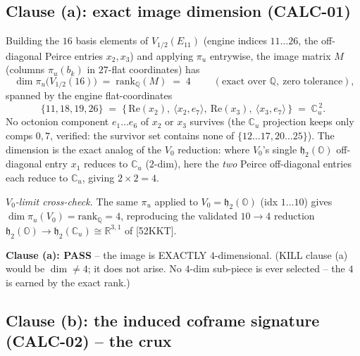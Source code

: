 \subsection{Clause (a): exact image dimension (CALC-01)}

Building the $16$ basis elements of $V_{1/2}(E_{11})$ (engine indices $11\ldots 26$,
the off-diagonal Peirce entries $x_2,x_3$) and applying $\pi_u$ entrywise, the image
matrix $M$ (columns $\pi_u(b_k)$ in $27$-flat coordinates) has
\begin{equation}
  \boxed{\;\dim \pi_u\!\big(V_{1/2}(16)\big) \;=\; \mathrm{rank}_{\mathbb{Q}}(M) \;=\; 4\;}
  \qquad (\text{exact over }\mathbb{Q},\ \text{zero tolerance}),
\end{equation}
spanned by the engine flat-coordinates
\[
  \{11,18,19,26\} \;=\; \{\,\mathrm{Re}(x_2),\ \langle x_2,e_7\rangle,\ \mathrm{Re}(x_3),\ \langle x_3,e_7\rangle\,\}
  \;=\; \mathbb{C}_u^{\,2}.
\]
No octonion component $e_1\ldots e_6$ of $x_2$ or $x_3$ survives (the $\mathbb{C}_u$
projection keeps only comps $0,7$, verified: the survivor set contains none of
$\{12\ldots17,20\ldots25\}$). The dimension is the exact analog of the $V_0$
reduction: where $V_0$'s single $\mathfrak{h}_2(\mathbb{O})$ off-diagonal entry $x_1$
reduces to $\mathbb{C}_u$ ($2$-dim), here the \emph{two} Peirce off-diagonal entries
each reduce to $\mathbb{C}_u$, giving $2\times 2 = 4$.

\emph{$V_0$-limit cross-check.} The same $\pi_u$ applied to $V_0=\mathfrak{h}_2(\mathbb{O})$
(idx $1\ldots10$) gives $\dim \pi_u(V_0)=\mathrm{rank}_{\mathbb{Q}}=4$, reproducing the
validated $10\to 4$ reduction $\mathfrak{h}_2(\mathbb{O})\to\mathfrak{h}_2(\mathbb{C}_u)
\cong\mathbb{R}^{3,1}$ of [52KKT].

\textbf{Clause (a): PASS} -- the image is EXACTLY $4$-dimensional. (KILL clause (a)
would be $\dim\neq 4$; it does not arise. No $4$-dim sub-piece is ever selected --
the $4$ is earned by the exact rank.)

\subsection{Clause (b): the induced coframe signature (CALC-02) -- the crux}

